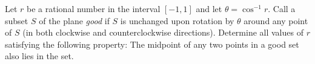 Let $r$ be a rational number in the interval $[-1,1]$ and let $\theta = \cos^{-1} r$.  Call a subset $S$ of the plane \emph{good} if $S$ is unchanged upon rotation by $\theta$ around any point of $S$ (in both clockwise and counterclockwise directions). Determine all values of $r$ satisfying the following property: The midpoint of any two points in a good set also lies in the set.